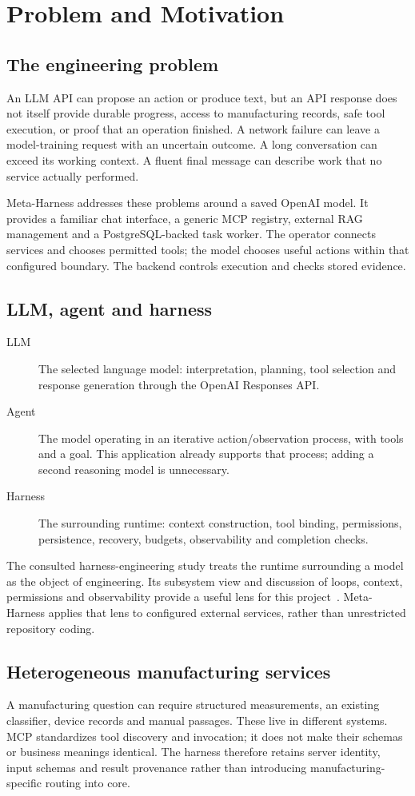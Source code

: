 \chapter{Problem and Motivation}
\section{The engineering problem}
An LLM API can propose an action or produce text, but an API response does not itself provide durable progress, access to manufacturing records, safe tool execution, or proof that an operation finished. A network failure can leave a model-training request with an uncertain outcome. A long conversation can exceed its working context. A fluent final message can describe work that no service actually performed.

Meta-Harness addresses these problems around a saved OpenAI model. It provides a familiar chat interface, a generic MCP registry, external RAG management and a PostgreSQL-backed task worker. The operator connects services and chooses permitted tools; the model chooses useful actions within that configured boundary. The backend controls execution and checks stored evidence.
\section{LLM, agent and harness}
\begin{description}
\item[LLM] The selected language model: interpretation, planning, tool selection and response generation through the OpenAI Responses API.
\item[Agent] The model operating in an iterative action/observation process, with tools and a goal. This application already supports that process; adding a second reasoning model is unnecessary.
\item[Harness] The surrounding runtime: context construction, tool binding, permissions, persistence, recovery, budgets, observability and completion checks.
\end{description}
The consulted harness-engineering study treats the runtime surrounding a model as the object of engineering. Its subsystem view and discussion of loops, context, permissions and observability provide a useful lens for this project~\cite{harness2026}. Meta-Harness applies that lens to configured external services, rather than unrestricted repository coding.
\section{Heterogeneous manufacturing services}
A manufacturing question can require structured measurements, an existing classifier, device records and manual passages. These live in different systems. MCP standardizes tool discovery and invocation; it does not make their schemas or business meanings identical. The harness therefore retains server identity, input schemas and result provenance rather than introducing manufacturing-specific routing into core.


